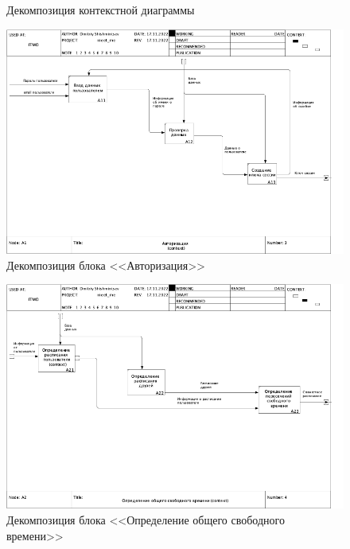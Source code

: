 \documentclass[14pt]{extreport}
\begin{document}
\begin{landscape}
\begin{figure}[h]
        \caption{ Декомпозиция контекстной диаграммы}
        \label{fig:idef02}
    \end{figure}
    \begin{figure}[h]   
        \centering
        \includegraphics[width=1\linewidth]{img/03_A1.png}
        \caption{ Декомпозиция блока <<Авторизация>>}
        \label{fig:idef03}
    \end{figure}
    \begin{figure}[h]   
        \centering
        \includegraphics[width=1\linewidth]{img/04_A2.png}
        \caption{ Декомпозиция блока <<Определение общего свободного времени>>}
        \label{fig:idef04}
    \end{figure}
    \begin{figure}[h]   
        \centering

\end{figure}
\end{landscape}
\end{document}
